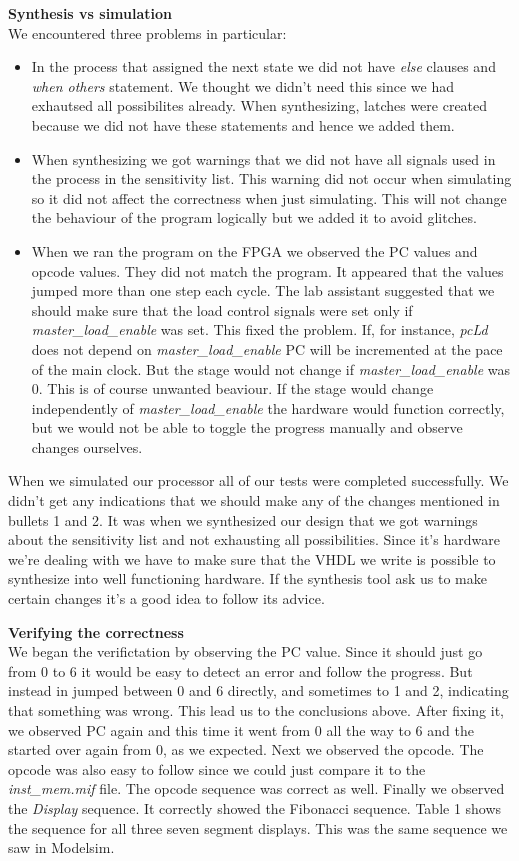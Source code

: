 \documentclass[a4paper,11pt]{article}
\begin{document}
\textbf{Synthesis vs simulation}\\
We encountered three problems in particular:
\begin{itemize}
  \item In the process that assigned the next state we did not have \textit{else} clauses and \textit{when others} statement. We thought we didn't need this since we had exhautsed all possibilites already. When synthesizing, latches were created because we did not have these statements and hence we added them.
  \item When synthesizing we got warnings that we did not have all signals used in the process in the sensitivity list. This warning did not occur when simulating so it did not affect the correctness when just simulating. This will not change the behaviour of the program logically but we added it to avoid glitches.
  \item When we ran the program on the FPGA we observed the PC values and opcode values. They did not match the program. It appeared that the values jumped more than one step each cycle. The lab assistant suggested that we should make sure that the load control signals were set only if \textit{master\_load\_enable} was set. This fixed the problem. If, for instance, \textit{pcLd} does not depend on \textit{master\_load\_enable} PC will be incremented at the pace of the main clock. But the stage would not change if \textit{master\_load\_enable} was 0. This is of course unwanted beaviour. If the stage would change independently of \textit{master\_load\_enable} the hardware would function correctly, but we would not be able to toggle the progress manually and observe changes ourselves.
\end{itemize}

When we simulated our processor all of our tests were completed successfully. We didn't get any indications that we should make any of the changes mentioned in bullets 1 and 2. It was when we synthesized our design that we got warnings about the sensitivity list and not exhausting all possibilities. Since it's hardware we're dealing with we have to make sure that the VHDL we write is possible to synthesize into well functioning hardware. If the synthesis tool ask us to make certain changes it's a good idea to follow its advice. 

\textbf{Verifying the correctness} \\
We began the verifictation by observing the PC value. Since it should just go from 0 to 6 it would be easy to detect an error and follow the progress. But instead in jumped between 0 and 6 directly, and sometimes to 1 and 2, indicating that something was wrong. This lead us to the conclusions above. After fixing it, we observed PC again and this time it went from 0 all the way to 6 and the started over again from 0, as we expected. Next we observed the opcode. The opcode was also easy to follow since we could just compare it to the \textit{inst\_mem.mif} file. The opcode sequence was correct as well. Finally we observed the \textit{Display} sequence. It correctly showed the Fibonacci sequence. Table 1 shows the sequence for all three seven segment displays. This was the same sequence we saw in Modelsim.
\end{document}
